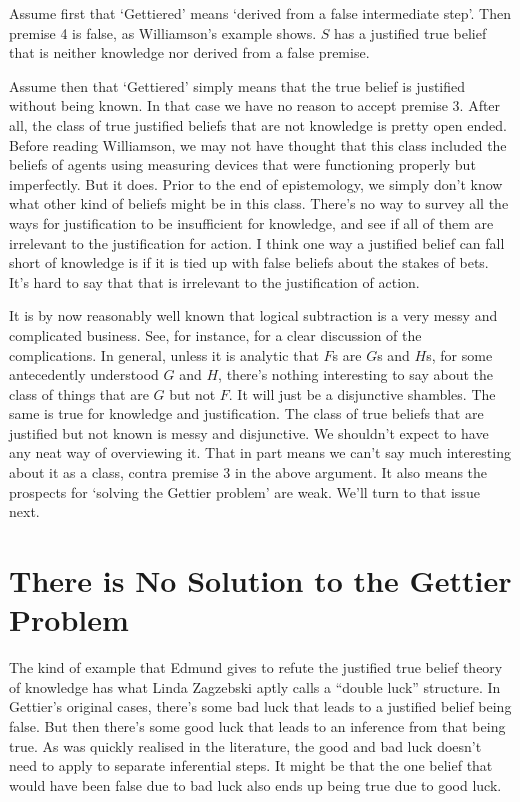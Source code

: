 Assume first that `Gettiered' means `derived from a false intermediate step'. Then premise 4 is false, as Williamson's example shows. $S$ has a justified true belief that is neither knowledge nor derived from a false premise.

Assume then that `Gettiered' simply means that the true belief is justified without being known. In that case we have no reason to accept premise 3. After all, the class of true justified beliefs that are not knowledge is pretty open ended. Before reading Williamson, we may not have thought that this class included the beliefs of agents using measuring devices that were functioning properly but imperfectly. But it does. Prior to the end of epistemology, we simply don't know what other kind of beliefs might be in this class. There's no way to survey all the ways for justification to be insufficient for knowledge, and see if all of them are irrelevant to the justification for action. I think one way a justified belief can fall short of knowledge is if it is tied up with false beliefs about the stakes of bets. It's hard to say that that is irrelevant to the justification of action.

It is by now reasonably well known that logical subtraction is a very messy and complicated business. See, for instance, \cite{Humberstone2000} for a clear discussion of the complications. In general, unless it is analytic that $F$s are $G$s and $H$s, for some antecedently understood $G$ and $H$, there's nothing interesting to say about the class of things that are $G$ but not $F$. It will just be a disjunctive shambles. The same is true for knowledge and justification. The class of true beliefs that are justified but not known is messy and disjunctive. We shouldn't expect to have any neat way of overviewing it. That in part means we can't say much interesting about it as a class, contra premise 3 in the above argument. It also means the prospects for `solving the Gettier problem' are weak. We'll turn to that issue next.

\section{There is No Solution to the Gettier Problem}

The kind of example that Edmund \cite{Gettier1963} gives to refute the justified true belief theory of knowledge has what Linda  Zagzebski \citeyearpar[117]{Zagzebski2009} aptly calls a ``double luck'' structure. In Gettier's original cases, there's some bad luck that leads to a justified belief being false. But then there's some good luck that leads to an inference from that being true. As was quickly realised in the literature, the good and bad luck doesn't need to apply to separate inferential steps. It might be that the one belief that would have been false due to bad luck also ends up being true due to good luck.

